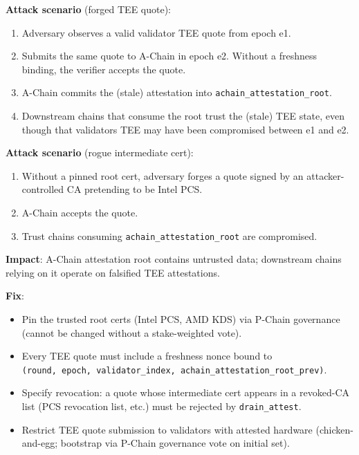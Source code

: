 \documentclass[
]{article}
\providecommand{\tightlist}{%
  \setlength{\itemsep}{0pt}\setlength{\parskip}{0pt}}
\begin{document}
\textbf{Attack scenario} (forged TEE quote):

\begin{enumerate}
\def\labelenumi{\arabic{enumi}.}
\tightlist
\item
  Adversary observes a valid validator TEE quote from epoch e1.
\item
  Submits the same quote to A-Chain in epoch e2. Without a freshness
  binding, the verifier accepts the quote.
\item
  A-Chain commits the (stale) attestation into
  \texttt{achain\_attestation\_root}.
\item
  Downstream chains that consume the root trust the (stale) TEE state,
  even though that validator\textquotesingle s TEE may have been
  compromised between e1 and e2.
\end{enumerate}

\textbf{Attack scenario} (rogue intermediate cert):

\begin{enumerate}
\def\labelenumi{\arabic{enumi}.}
\tightlist
\item
  Without a pinned root cert, adversary forges a quote signed by an
  attacker-controlled CA pretending to be Intel PCS.
\item
  A-Chain accepts the quote.
\item
  Trust chains consuming \texttt{achain\_attestation\_root} are
  compromised.
\end{enumerate}

\textbf{Impact}: A-Chain attestation root contains untrusted data;
downstream chains relying on it operate on falsified TEE attestations.

\textbf{Fix}:

\begin{itemize}
\tightlist
\item
  Pin the trusted root certs (Intel PCS, AMD KDS) via P-Chain governance
  (cannot be changed without a stake-weighted vote).
\item
  Every TEE quote must include a freshness nonce bound to
  \texttt{(round,\ epoch,\ validator\_index,\ achain\_attestation\_root\_prev)}.
\item
  Specify revocation: a quote whose intermediate cert appears in a
  revoked-CA list (PCS revocation list, etc.) must be rejected by
  \texttt{drain\_attest}.
\item
  Restrict TEE quote submission to validators with attested hardware
  (chicken-and-egg; bootstrap via P-Chain governance vote on initial
  set).
\end{itemize}
\end{document}
